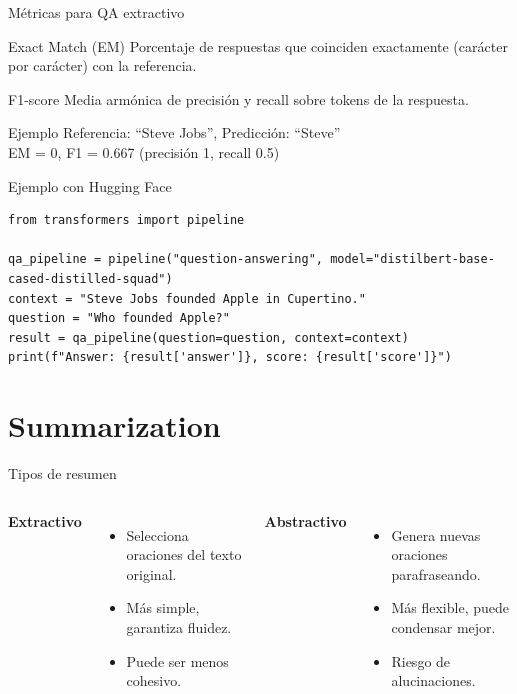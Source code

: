 \documentclass[aspectratio=169, 10pt, xcolor=table]{beamer}
\begin{document}
\begin{frame}{Métricas para QA extractivo}
    \begin{block}{Exact Match (EM)}
        Porcentaje de respuestas que coinciden exactamente (carácter por carácter) con la referencia.
    \end{block}
    \begin{block}{F1-score}
        Media armónica de precisión y recall sobre tokens de la respuesta.
    \end{block}
    \begin{exampleblock}{Ejemplo}
        Referencia: ``Steve Jobs'', Predicción: ``Steve'' \\
        EM = 0, F1 = 0.667 (precisión 1, recall 0.5)
    \end{exampleblock}
\end{frame}

\begin{frame}[fragile]{Ejemplo con Hugging Face}
    \begin{lstlisting}
from transformers import pipeline

qa_pipeline = pipeline("question-answering", model="distilbert-base-cased-distilled-squad")
context = "Steve Jobs founded Apple in Cupertino."
question = "Who founded Apple?"
result = qa_pipeline(question=question, context=context)
print(f"Answer: {result['answer']}, score: {result['score']}")
    \end{lstlisting}
\end{frame}

\section{Summarization}

\begin{frame}{Tipos de resumen}
    \begin{columns}[t]
        \textbf{Extractivo}
        \begin{itemize}
            \item Selecciona oraciones del texto original.
            \item Más simple, garantiza fluidez.
            \item Puede ser menos cohesivo.
        \end{itemize}
        \textbf{Abstractivo}
        \begin{itemize}
            \item Genera nuevas oraciones parafraseando.
            \item Más flexible, puede condensar mejor.
            \item Riesgo de alucinaciones.
        \end{itemize}
    \end{columns}
\end{frame}
\end{document}
